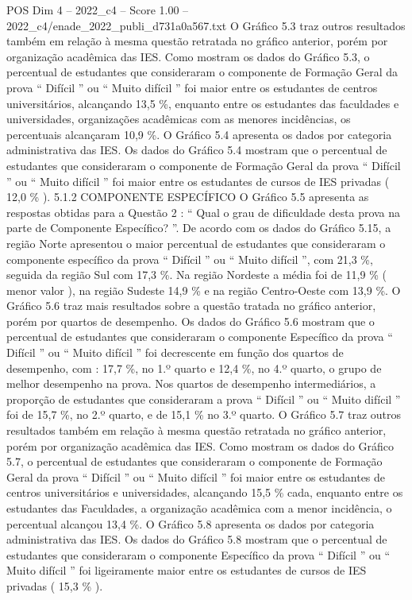 \begin{textsample}{POS Dim 4 – 2022\_c4 – Score 1.00 – 2022\_c4/enade\_2022\_publi\_d731a0a567.txt}
O Gráfico 5.3 traz outros resultados também em relação à mesma questão retratada no gráfico anterior, porém por organização acadêmica das IES.
Como mostram os dados do Gráfico 5.3, o percentual de estudantes que consideraram o componente de Formação Geral da prova “ Difícil ” ou “ Muito difícil ” foi maior entre os estudantes de centros universitários, alcançando 13,5 \%, enquanto entre os estudantes das faculdades e universidades, organizações acadêmicas com as menores incidências, os percentuais alcançaram 10,9 \%.
O Gráfico 5.4 apresenta os dados por categoria administrativa das IES.
Os dados do Gráfico 5.4 mostram que o percentual de estudantes que consideraram o componente de Formação Geral da prova “ Difícil ” ou “ Muito difícil ” foi maior entre os estudantes de cursos de IES privadas ( 12,0 \% ). 5.1.2 COMPONENTE ESPECÍFICO O Gráfico 5.5 apresenta as respostas obtidas para a Questão 2 : “ Qual o grau de dificuldade desta prova na parte de Componente Específico? ”.
De acordo com os dados do Gráfico 5.15, a região Norte apresentou o maior percentual de estudantes que consideraram o componente específico da prova “ Difícil ” ou “ Muito difícil ”, com 21,3 \%, seguida da região Sul com 17,3 \%.
Na região Nordeste a média foi de 11,9 \% ( menor valor ), na região Sudeste 14,9 \% e na região Centro-Oeste com 13,9 \%.
O Gráfico 5.6 traz mais resultados sobre a questão tratada no gráfico anterior, porém por quartos de desempenho.
Os dados do Gráfico 5.6 mostram que o percentual de estudantes que consideraram o componente Específico da prova “ Difícil ” ou “ Muito difícil ” foi decrescente em função dos quartos de desempenho, com : 17,7 \%, no 1.º quarto e 12,4 \%, no 4.º quarto, o grupo de melhor desempenho na prova.
Nos quartos de desempenho intermediários, a proporção de estudantes que consideraram a prova “ Difícil ” ou “ Muito difícil ” foi de 15,7 \%, no 2.º quarto, e de 15,1 \% no 3.º quarto.
O Gráfico 5.7 traz outros resultados também em relação à mesma questão retratada no gráfico anterior, porém por organização acadêmica das IES.
Como mostram os dados do Gráfico 5.7, o percentual de estudantes que consideraram o componente de Formação Geral da prova “ Difícil ” ou “ Muito difícil ” foi maior entre os estudantes de centros universitários e universidades, alcançando 15,5 \% cada, enquanto entre os estudantes das Faculdades, a organização acadêmica com a menor incidência, o percentual alcançou 13,4 \%.
O Gráfico 5.8 apresenta os dados por categoria administrativa das IES.
Os dados do Gráfico 5.8 mostram que o percentual de estudantes que consideraram o componente Específico da prova “ Difícil ” ou “ Muito difícil ” foi ligeiramente maior entre os estudantes de cursos de IES privadas ( 15,3 \% ).

\end{textsample}
